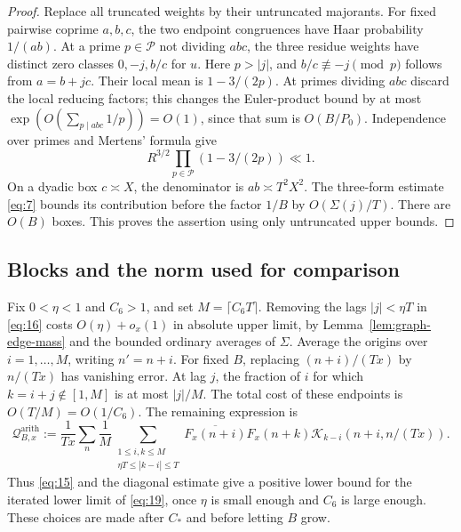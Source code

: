 \begin{proof}
Replace all truncated weights by their untruncated majorants.
For fixed pairwise coprime $a,b,c$, the two endpoint congruences have
Haar probability $1/(ab)$. At a prime $p\in\mathcal P$ not dividing
$abc$, the three residue weights have distinct zero classes
$0,-j,b/c$ for $u$. Here $p>|j|$, and $b/c\not\equiv-j\pmod p$
follows from $a=b+jc$. Their local mean is $1-3/(2p)$.
At primes dividing $abc$ discard the local reducing factors; this
changes the Euler-product bound by at most
$\exp(O(\sum_{p\mid abc}1/p))=O(1)$, since that sum is $O(B/P_0)$.
Independence over primes and Mertens' formula give
\[
 R^{3/2}\prod_{p\in\mathcal P}(1-3/(2p))\ll1.
\]
On a dyadic box $c\asymp X$, the denominator is
$ab\asymp T^2X^2$. The three-form estimate \eqref{eq:7} bounds its
contribution before the factor $1/B$ by $O(\Sigma(j)/T)$.
There are $O(B)$ boxes. This proves the assertion using only
untruncated upper bounds.
\end{proof}

\subsection{Blocks and the norm used for comparison}

Fix $0<\eta<1$ and $C_6>1$, and set $M=\lceil C_6T\rceil$.
Removing the lags $|j|<\eta T$ in \eqref{eq:16} costs
$O(\eta)+o_x(1)$ in absolute upper limit, by
Lemma~\ref{lem:graph-edge-mass} and the bounded ordinary averages of
$\Sigma$. Average the origins over $i=1,\ldots,M$, writing
$n'=n+i$. For fixed $B$, replacing $(n+i)/(Tx)$ by $n/(Tx)$
has vanishing error. At lag $j$, the fraction of $i$ for which
$k=i+j\notin[1,M]$ is at most $|j|/M$. The total cost of these
endpoints is $O(T/M)=O(1/C_6)$. The remaining expression is
\begin{equation}\label{eq:19}
 \mathcal Q^{\mathrm{arith}}_{B,x}:=\frac1{Tx}\sum_n\frac1M
 \sum_{\substack{1\le i,k\le M\\\eta T\le|k-i|\le T}}
 \overline{F_x(n+i)}F_x(n+k)
 \mathcal K_{k-i}(n+i,n/(Tx)).
\end{equation}
Thus \eqref{eq:15} and the diagonal estimate give a positive lower
bound for the iterated lower limit of \eqref{eq:19}, once $\eta$ is
small enough and $C_6$ is large enough. These choices are made after
$C_*$ and before letting $B$ grow.

